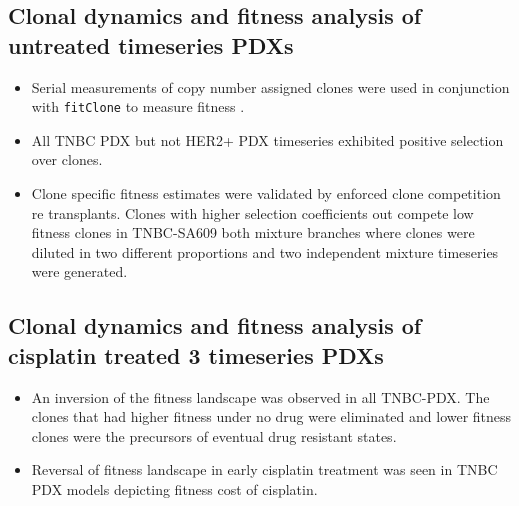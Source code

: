 \subsection {Clonal dynamics and fitness analysis of untreated timeseries PDXs}
\begin{itemize}

\item Serial measurements of copy number assigned clones were used in conjunction with \texttt{fitClone} to measure fitness \cite{salehi2020single}.

\item All TNBC PDX but not HER2+ PDX timeseries exhibited positive selection over clones.

\item Clone specific fitness estimates were validated by enforced clone competition re transplants. Clones with higher selection coefficients out compete low fitness clones in TNBC-SA609 both mixture branches where clones were diluted in two different proportions and two independent mixture timeseries were generated.
 
\end{itemize} 

\subsection {Clonal dynamics and fitness analysis of cisplatin treated 3 timeseries PDXs}
\begin{itemize}
 \item  An inversion of the fitness landscape was observed in all TNBC-PDX. The  clones that had higher fitness under no drug were eliminated and lower fitness clones were the precursors of eventual drug resistant states.
 
 \item Reversal of fitness landscape in early cisplatin treatment was seen in TNBC PDX models depicting fitness cost of cisplatin.
 
 \end{itemize}
 
